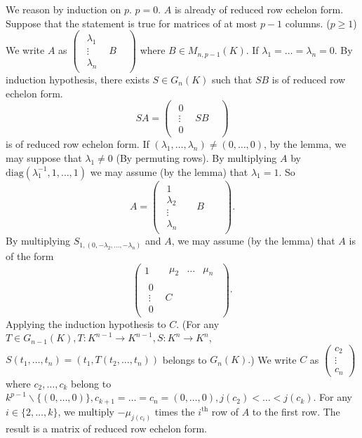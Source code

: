 \documentclass{book}
\numberwithin{equation}{section}
\begin{document}
\begin{proofenv}
    We reason by induction on $p$.
    \newline
    $p=0$. $A$ is already of reduced row echelon form.
    \newline
    Suppose that the statement is true for matrices of at most $p-1$ columns. ($p\ge 1$) We write $A$ as $\begin{pmatrix}
 \begin{matrix}
 \lambda _1\\
 \vdots\\
\lambda _n
\end{matrix} &B&
\end{pmatrix}$ where $B\in M_{n,p-1}(K)$. If $\lambda_1=\dots=\lambda_n=0$. By induction hypothesis, there exists $S\in G_n(K)$ such that $SB$ is of reduced row echelon form.
$$SA= \begin{pmatrix}\begin{matrix}
0\\
 \vdots\\
0
\end{matrix} &SB&
\end{pmatrix}$$
 is of reduced row echelon form. If $(\lambda_1,\dots,\lambda_n)\not=(0,\dots,0)$, by the lemma, we may suppose that $\lambda_1\not=0$ (By permuting rows). By multiplying $A$ by $\mathrm{diag}(\lambda_1^{-1},1,\dots,1)$ we may assume (by the lemma) that $\lambda_1=1$. So 
 $$A= \begin{pmatrix}\begin{matrix}
 1\\
\lambda _2\\
 \vdots\\
\lambda _n
\end{matrix} &&B&&
\end{pmatrix}.$$
By multiplying $S_{1,(0,-\lambda_2,\dots,-\lambda_n)}$ and $A$, we may assume (by the lemma) that $A$ is of the form 
$$\begin{pmatrix}
 1 &\begin{matrix}
  \mu_2& \dots &\mu_n
\end{matrix} \\
 \begin{matrix}
 0\\
 \vdots\\
0
\end{matrix} &C
\end{pmatrix}.$$
Applying the induction hypothesis to $C$.
(For any $T\in G_{n-1}(K), T:K^{n-1}\rightarrow K^{n-1}, S:K^n\rightarrow K^n$, $S(t_1,\dots,t_n)=(t_1,T(t_2,\dots,t_n))$ belongs to $G_n(K).$)
We write $C$ as $\begin{pmatrix}
    c_2\\
    \vdots\\
    c_n
\end{pmatrix}$
where $c_2,\dots,c_k$ belong to $k^{p-1}\backslash\{(0,\dots,0)\},c_{k+1}=\dots=c_n=(0,\dots,0),j(c_2)<\dots<j(c_k)$. For any $i\in \{2,\dots,k\}$, we multiply $-\mu_{j(c_i)}$ times the $i^{\text{th}}$ row of $A$ to the first row. The result is a matrix of reduced row echelon form.
\end{proofenv}
\end{document}
